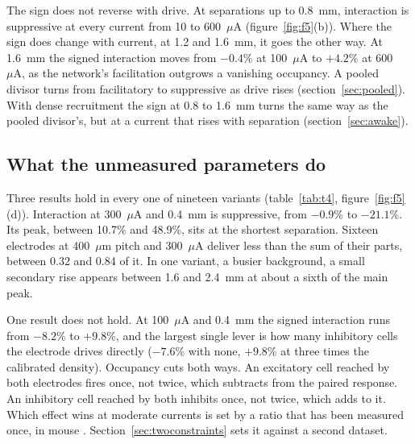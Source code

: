 \documentclass[10pt,twocolumn]{article}
\newcommand{\um}{\ensuremath{\mu\text{m}}}
\newcommand{\uA}{\ensuremath{\mu\text{A}}}
\begin{document}
The sign does not reverse with drive. At separations up to 0.8~mm,
interaction is suppressive at every current from 10 to 600~\uA{}
(figure~\ref{fig:f5}(b)). Where the sign does change with current, at
1.2 and 1.6~mm, it goes the other way. At 1.6~mm the signed interaction moves
from $-0.4$\% at 100~\uA{} to $+4.2$\% at 600~\uA, as the network's
facilitation outgrows a vanishing occupancy. A pooled divisor turns from
facilitatory to suppressive as drive rises (section~\ref{sec:pooled}).
With dense recruitment the sign at 0.8 to 1.6~mm turns the same way as the
pooled divisor's, but at a current that rises with separation
(section~\ref{sec:awake}).

\subsection{What the unmeasured parameters do}
\label{sec:sensitivity}

Three results hold in every one of nineteen variants (table~\ref{tab:t4},
figure~\ref{fig:f5}(d)). Interaction at 300~\uA{} and 0.4~mm is
suppressive, from $-0.9$\% to $-21.1$\%. Its peak, between 10.7\% and
48.9\%, sits at the shortest separation. Sixteen electrodes at 400~\um{}
pitch and 300~\uA{} deliver less than the sum of their parts, between
0.32 and 0.84 of it. In one variant, a busier background, a small
secondary rise appears between 1.6 and 2.4~mm at about a sixth of the main
peak.

One result does not hold. At 100~\uA{} and 0.4~mm the signed interaction
runs from $-8.2$\% to $+9.8$\%, and the largest single lever is how many
inhibitory cells the electrode drives directly ($-7.6$\% with none,
$+9.8$\% at three times the calibrated density). Occupancy cuts both ways.
An excitatory cell reached by both electrodes fires once, not twice, which
subtracts from the paired response. An inhibitory cell reached by both
inhibits once, not twice, which adds to it. Which effect wins at moderate
currents is set by a ratio that has been measured once, in mouse
\citep{dadarlat2024}. Section~\ref{sec:twoconstraints} sets it against a
second dataset.

\begin{table}[t]
\centering
\caption{The model against measurements. ``Fitted'' marks the two
  calibrated quantities. Everything else is a prediction. Paired net
  modulation is for electrodes 485~\um{} apart at 200~Hz, in percent of the
  summed single responses, and the measured row gives only its sign.
  Phosphene diameter is the half-maximum size read out through the
  implant's retinotopy. $^\ast$The Dynaphos baseline, built from the
  current-spread law and cortical magnification.}
\label{tab:t3}
\small

\end{table}
\end{document}
